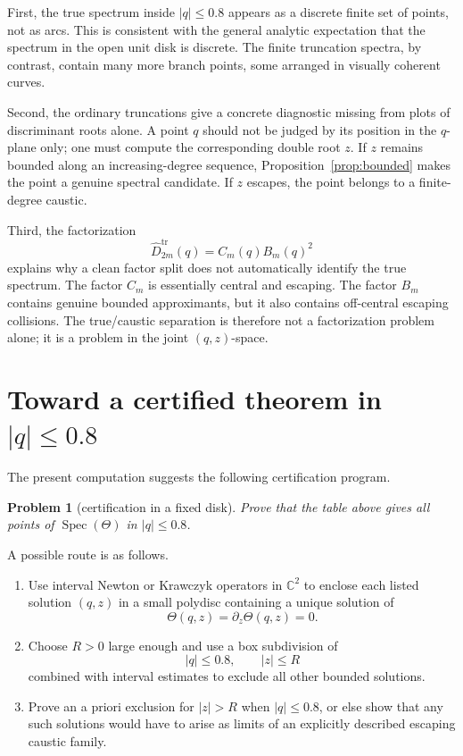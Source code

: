 \documentclass[11pt,a4paper,reqno]{amsart}
\newtheorem{problem}[theorem]{Problem}
\theoremstyle{remark}
\newcommand{\C}{\mathbb C}
\newcommand{\Spec}{\operatorname{Spec}}
\newcommand{\Th}{\Theta}
\newcommand{\tr}{\mathrm{tr}}
\begin{document}
First, the true spectrum inside $|q|\leq0.8$ appears as a discrete finite set of points, not as arcs.  This is consistent with the general analytic expectation that the spectrum in the open unit disk is discrete.  The finite truncation spectra, by contrast, contain many more branch points, some arranged in visually coherent curves.

Second, the ordinary truncations give a concrete diagnostic missing from plots of discriminant roots alone.  A point $q$ should not be judged by its position in the $q$-plane only; one must compute the corresponding double root $z$.  If $z$ remains bounded along an increasing-degree sequence, Proposition~\ref{prop:bounded} makes the point a genuine spectral candidate.  If $z$ escapes, the point belongs to a finite-degree caustic.

Third, the factorization
\[
  \widehat D_{2m}^{\tr}(q)=C_m(q)B_m(q)^2
\]
explains why a clean factor split does not automatically identify the true spectrum.  The factor $C_m$ is essentially central and escaping.  The factor $B_m$ contains genuine bounded approximants, but it also contains off-central escaping collisions.  The true/caustic separation is therefore not a factorization problem alone; it is a problem in the joint $(q,z)$-space.

\section{Toward a certified theorem in $|q|\leq0.8$}
The present computation suggests the following certification program.

\begin{problem}[certification in a fixed disk]
Prove that the table above gives all points of $\Spec(\Th)$ in $|q|\leq0.8$.
\end{problem}

A possible route is as follows.

\begin{enumerate}
\item Use interval Newton or Krawczyk operators in $\C^2$ to enclose each listed solution $(q,z)$ in a small polydisc containing a unique solution of
\[
  \Th(q,z)=\partial_z\Th(q,z)=0.
\]
\item Choose $R>0$ large enough and use a box subdivision of
\[
  |q|\leq0.8,
  \qquad
  |z|\leq R
\]
combined with interval estimates to exclude all other bounded solutions.
\item Prove an a priori exclusion for $|z|>R$ when $|q|\leq0.8$, or else show that any such solutions would have to arise as limits of an explicitly described escaping caustic family.
\end{enumerate}
\end{document}
